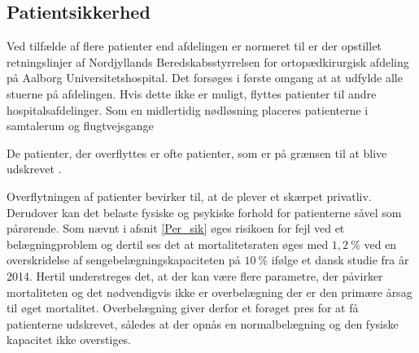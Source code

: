 

\subsection{Patientsikkerhed}
Ved tilfælde af flere patienter end afdelingen er normeret til er der opstillet retningslinjer af Nordjyllands Beredskabsstyrrelsen for ortopædkirurgisk afdeling på Aalborg Universitetshospital. Det forsøges i første omgang at  at udfylde alle stuerne på afdelingen. Hvis dette ikke er muligt, flyttes patienter til andre hospitalsafdelinger. 
Som en midlertidig nødløsning placeres patienterne i samtalerum og flugtvejsgange \cite{Beredskab2016}

De patienter, der overflyttes er ofte patienter, som er på grænsen til at blive udskrevet .
\noindent

Overflytningen af patienter bevirker til, at de plever et skærpet privatliv. \cite{Madsen2014} Derudover kan det belaste fysiske og psykiske forhold for patienterne såvel som pårørende. \cite{Heidmann2014} Som nævnt i afsnit \ref{Per_sik} øges risikoen for fejl ved et belægningproblem og dertil ses det at mortalitetsraten øges med $1,2~\%$ ved en overskridelse af sengebelægningskapaciteten på $10~\%$ ifølge et dansk studie fra år 2014. \cite{Madsen2014} Hertil understreges det, at der kan være flere parametre, der påvirker mortaliteten og det nødvendigvis ikke er overbelægning der er den primære årsag til øget mortalitet. Overbelægning giver derfor et forøget pres for at få patienterne udskrevet, således at der opnås en normalbelægning og  den fysiske kapacitet ikke overstiges.  



